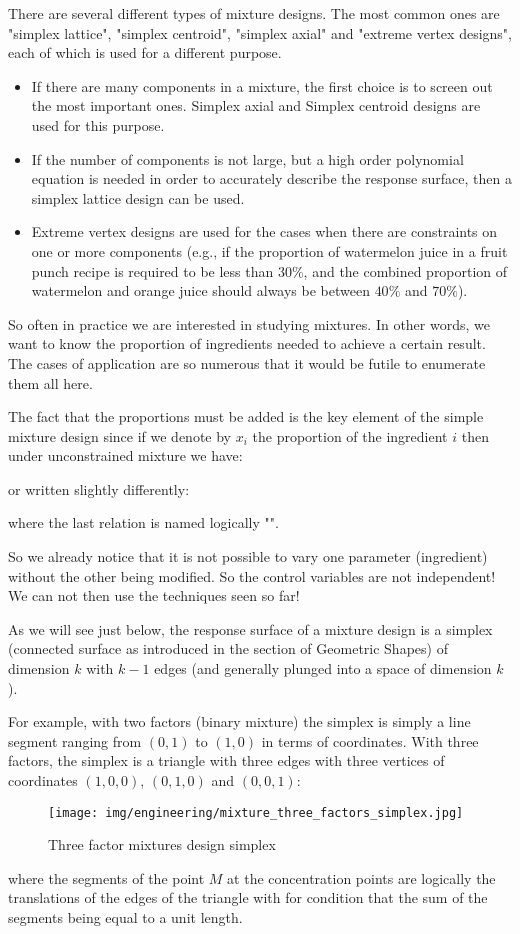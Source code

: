 	There are several different types of mixture designs. The most common ones are "simplex lattice", "simplex centroid", "simplex axial" and "extreme vertex designs", each of which is used for a different purpose.
	\begin{itemize}
		\item If there are many components in a mixture, the first choice is to screen out the most important ones. Simplex axial and Simplex centroid designs are used for this purpose.

		\item If the number of components is not large, but a high order polynomial equation is needed in order to accurately describe the response surface, then a simplex lattice design can be used.

		\item Extreme vertex designs are used for the cases when there are constraints on one or more components (e.g., if the proportion of watermelon juice in a fruit punch recipe is required to be less than $30\%$, and the combined proportion of watermelon and orange juice should always be between $40\%$ and $70\%$).
	\end{itemize}
	So often in practice we are interested in studying mixtures. In other words, we want to know the proportion of ingredients needed to achieve a certain result. The cases of application are so numerous that it would be futile to enumerate them all here.

	The fact that the proportions must be added is the key element of the simple mixture design since if we denote by $x_i$ the proportion of the ingredient $i$ then under unconstrained mixture we have:
	
 	or written slightly differently:
	
	where the last relation is named logically "".

	So we already notice that it is not possible to vary one parameter (ingredient) without the other being modified. So the control variables are not independent! We can not then use the techniques seen so far!

	As we will see just below, the response surface of a mixture design is a simplex (connected surface as introduced in the section of Geometric Shapes) of dimension $k$ with $k-1$ edges (and generally plunged into a space of dimension $k$).

	For example, with two factors (binary mixture) the simplex  is simply a line segment ranging from $(0,1)$ to $(1,0)$ in terms of coordinates. With three factors, the simplex is a triangle with three edges with three vertices of coordinates $(1,0,0)$, $(0,1,0)$ and $(0,0,1)$:
	\begin{figure}[H]
		\centering
		\texttt{[image: img/engineering/mixture\_three\_factors\_simplex.jpg]}	
		\caption{Three factor mixtures design simplex}
	\end{figure}
	where the segments of the point $M$ at the concentration points  are logically the translations of the edges of the triangle with for condition that the sum of the segments being equal to a unit length.

